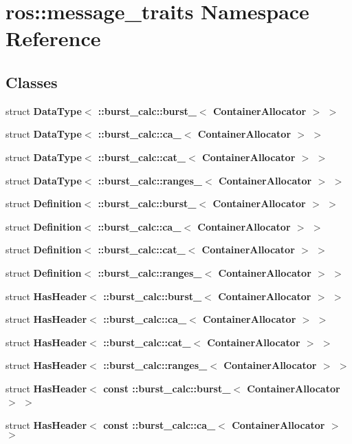 \section{ros\-:\-:message\-\_\-traits \-Namespace \-Reference}
\label{namespaceros_1_1message__traits}
\subsection*{\-Classes}
\begin{DoxyCompactItemize}
\item 
struct {\bf \-Data\-Type$<$ \-::burst\-\_\-calc\-::burst\-\_\-$<$ Container\-Allocator $>$ $>$}
\item 
struct {\bf \-Data\-Type$<$ \-::burst\-\_\-calc\-::ca\-\_\-$<$ Container\-Allocator $>$ $>$}
\item 
struct {\bf \-Data\-Type$<$ \-::burst\-\_\-calc\-::cat\-\_\-$<$ Container\-Allocator $>$ $>$}
\item 
struct {\bf \-Data\-Type$<$ \-::burst\-\_\-calc\-::ranges\-\_\-$<$ Container\-Allocator $>$ $>$}
\item 
struct {\bf \-Definition$<$ \-::burst\-\_\-calc\-::burst\-\_\-$<$ Container\-Allocator $>$ $>$}
\item 
struct {\bf \-Definition$<$ \-::burst\-\_\-calc\-::ca\-\_\-$<$ Container\-Allocator $>$ $>$}
\item 
struct {\bf \-Definition$<$ \-::burst\-\_\-calc\-::cat\-\_\-$<$ Container\-Allocator $>$ $>$}
\item 
struct {\bf \-Definition$<$ \-::burst\-\_\-calc\-::ranges\-\_\-$<$ Container\-Allocator $>$ $>$}
\item 
struct {\bf \-Has\-Header$<$ \-::burst\-\_\-calc\-::burst\-\_\-$<$ Container\-Allocator $>$ $>$}
\item 
struct {\bf \-Has\-Header$<$ \-::burst\-\_\-calc\-::ca\-\_\-$<$ Container\-Allocator $>$ $>$}
\item 
struct {\bf \-Has\-Header$<$ \-::burst\-\_\-calc\-::cat\-\_\-$<$ Container\-Allocator $>$ $>$}
\item 
struct {\bf \-Has\-Header$<$ \-::burst\-\_\-calc\-::ranges\-\_\-$<$ Container\-Allocator $>$ $>$}
\item 
struct {\bf \-Has\-Header$<$ const \-::burst\-\_\-calc\-::burst\-\_\-$<$ Container\-Allocator $>$ $>$}
\item 
struct {\bf \-Has\-Header$<$ const \-::burst\-\_\-calc\-::ca\-\_\-$<$ Container\-Allocator $>$ $>$}
\item 

\end{DoxyCompactItemize}
